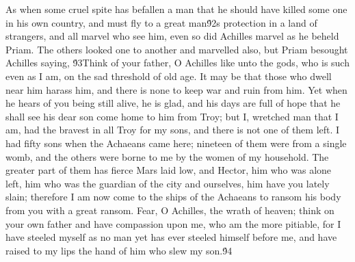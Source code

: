 {As when some cruel spite has befallen a man that he should have killed some one in his own country, and must fly to a great man\'92s protection in a land of strangers, and all marvel who see him, even so did Achilles marvel as he beheld Priam. The others looked one to another and marvelled also, but Priam besought Achilles saying, \'93Think of your father, O Achilles like unto the gods, who is such even as I am, on the sad threshold of old age. It may be that those who dwell near him harass him, and there is none to keep war and ruin from him. Yet when he hears of you being still alive, he is glad, and his days are full of hope that he shall see his dear son come home to him from Troy; but I, wretched man that I am, had the bravest in all Troy for my sons, and there is not one of them left. I had fifty sons when the Achaeans came here; nineteen of them were from a single womb, and the others were borne to me by the women of my household. The greater part of them has fierce Mars laid low, and Hector, him who was alone left, him who was the guardian of the city and ourselves, him have you lately slain; therefore I am now come to the ships of the Achaeans to ransom his body from you with a great ransom. Fear, O Achilles, the wrath of heaven; think on your own father and have compassion upon me, who am the more pitiable, for I have steeled myself as no man yet has ever steeled himself before me, and have raised to my lips the hand of him who slew my son.\'94\
}
